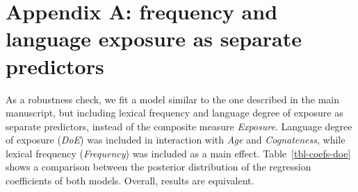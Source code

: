 \documentclass[
]{article}
\author{}
\date{}
\begin{document}
\ifdefined\Shaded\renewenvironment{Shaded}{\begin{tcolorbox}[interior hidden, borderline west={3pt}{0pt}{shadecolor}, enhanced, breakable, sharp corners, boxrule=0pt, frame hidden]}{\end{tcolorbox}}\fi

\hypertarget{appendix-a-frequency-and-language-exposure-as-separate-predictors}{%
\section*{Appendix A: frequency and language exposure as separate
predictors}\label{appendix-a-frequency-and-language-exposure-as-separate-predictors}}

As a robustness check, we fit a model similar to the one described in
the main manuscript, but including lexical frequency and language degree
of exposure as separate predictors, instead of the composite measure
\emph{Exposure}. Language degree of exposure (\emph{DoE}) was included
in interaction with \emph{Age} and \emph{Cognateness}, while lexical
frequency (\emph{Frequency}) was included as a main effect.
Table~\ref{tbl-coefs-doe} shows a comparison between the posterior
distribution of the regression coefficients of both models. Overall,
results are equivalent.
\end{document}
